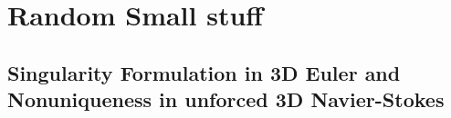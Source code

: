 \chapter{Random Small stuff}

\section{Singularity Formulation in 3D Euler and Nonuniqueness in unforced 3D Navier-Stokes}
